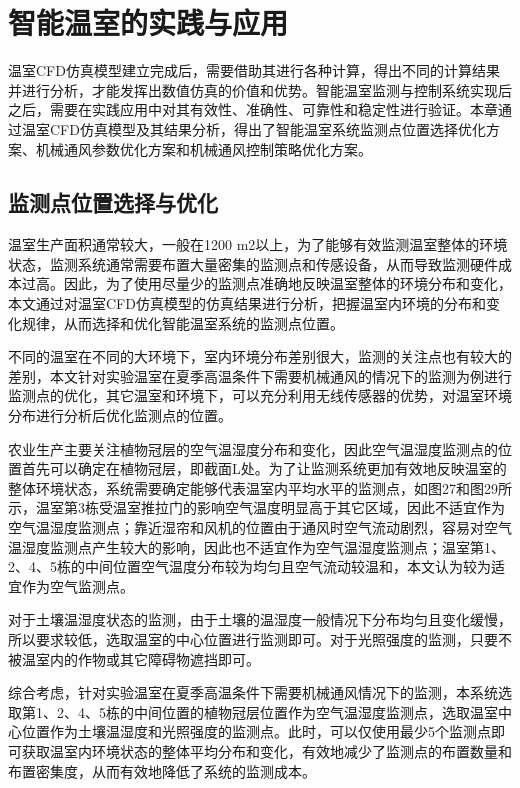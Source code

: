 

\chapter{智能温室的实践与应用}
\label{chapter:Application}
温室CFD仿真模型建立完成后，需要借助其进行各种计算，得出不同的计算结果并进行分析，才能发挥出数值仿真的价值和优势。智能温室监测与控制系统实现后之后，需要在实践应用中对其有效性、准确性、可靠性和稳定性进行验证。本章通过温室CFD仿真模型及其结果分析，得出了智能温室系统监测点位置选择优化方案、机械通风参数优化方案和机械通风控制策略优化方案。

\section{监测点位置选择与优化}
温室生产面积通常较大，一般在1200 m2以上，为了能够有效监测温室整体的环境状态，监测系统通常需要布置大量密集的监测点和传感设备，从而导致监测硬件成本过高。因此，为了使用尽量少的监测点准确地反映温室整体的环境分布和变化，本文通过对温室CFD仿真模型的仿真结果进行分析，把握温室内环境的分布和变化规律，从而选择和优化智能温室系统的监测点位置。

不同的温室在不同的大环境下，室内环境分布差别很大，监测的关注点也有较大的差别，本文针对实验温室在夏季高温条件下需要机械通风的情况下的监测为例进行监测点的优化，其它温室和环境下，可以充分利用无线传感器的优势，对温室环境分布进行分析后优化监测点的位置。

农业生产主要关注植物冠层的空气温湿度分布和变化，因此空气温湿度监测点的位置首先可以确定在植物冠层，即截面L处。为了让监测系统更加有效地反映温室的整体环境状态，系统需要确定能够代表温室内平均水平的监测点，如图27和图29所示，温室第3栋受温室推拉门的影响空气温度明显高于其它区域，因此不适宜作为空气温湿度监测点；靠近湿帘和风机的位置由于通风时空气流动剧烈，容易对空气温湿度监测点产生较大的影响，因此也不适宜作为空气温湿度监测点；温室第1、2、4、5栋的中间位置空气温度分布较为均匀且空气流动较温和，本文认为较为适宜作为空气监测点。

对于土壤温湿度状态的监测，由于土壤的温湿度一般情况下分布均匀且变化缓慢，所以要求较低，选取温室的中心位置进行监测即可。对于光照强度的监测，只要不被温室内的作物或其它障碍物遮挡即可。

综合考虑，针对实验温室在夏季高温条件下需要机械通风情况下的监测，本系统选取第1、2、4、5栋的中间位置的植物冠层位置作为空气温湿度监测点，选取温室中心位置作为土壤温湿度和光照强度的监测点。此时，可以仅使用最少5个监测点即可获取温室内环境状态的整体平均分布和变化，有效地减少了监测点的布置数量和布置密集度，从而有效地降低了系统的监测成本。

